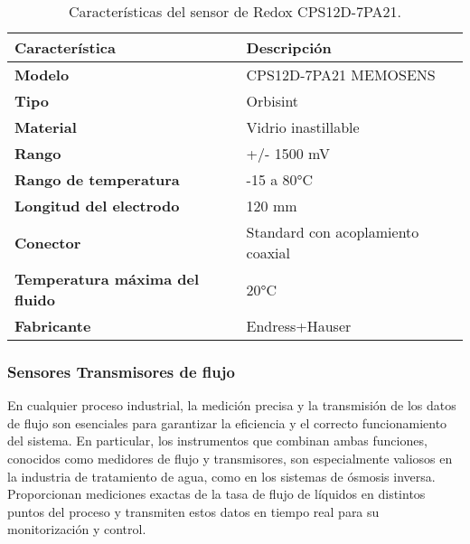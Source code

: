 \begin{table}[H]
    \centering
    \caption{Características del sensor de Redox CPS12D-7PA21.}
    \label{table:sensor_redox}
    \begin{tabular}{| L{6cm} | L{6cm} |}
        \hline
        \textbf{Característica}                & \textbf{Descripción}              \\
        \hline
        \textbf{Modelo}                        & CPS12D-7PA21 MEMOSENS             \\
        \hline
        \textbf{Tipo}                          & Orbisint                          \\
        \hline
        \textbf{Material}                      & Vidrio inastillable               \\
        \hline
        \textbf{Rango}                         & +/- 1500 mV                       \\
        \hline
        \textbf{Rango de temperatura}          & -15 a 80°C                        \\
        \hline
        \textbf{Longitud del electrodo}        & 120 mm                            \\
        \hline
        \textbf{Conector}                      & Standard con acoplamiento coaxial \\
        \hline
        \textbf{Temperatura máxima del fluido} & 20°C                              \\
        \hline
        \textbf{Fabricante}                    & Endress+Hauser                    \\
        \hline
    \end{tabular}
\end{table}


\subsubsection{Sensores Transmisores de flujo} \label{sec:sensor_flujo}

En cualquier proceso industrial, la medición precisa y la transmisión de los datos de flujo son esenciales para
garantizar la eficiencia y el correcto funcionamiento del sistema. En particular, los instrumentos que combinan
ambas funciones, conocidos como medidores de flujo y transmisores, son especialmente valiosos en la industria de
tratamiento de agua, como en los sistemas de ósmosis inversa. Proporcionan mediciones exactas de la tasa de flujo de
líquidos en distintos puntos del proceso y transmiten estos datos en tiempo real para su monitorización y control.\\

